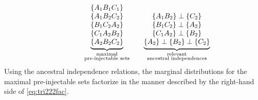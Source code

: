 {\begin{align}
\qquad\qquad
{\underbrace{\begin{matrix}
\left\lbrace A_1 B_1 C_1\right\rbrace \\
\left\lbrace A_1 B_2 C_2\right\rbrace \\
\left\lbrace B_1 C_2 A_2\right\rbrace \\
\left\lbrace C_1 A_2 B_2\right\rbrace \\
\left\lbrace A_2 B_2 C_2\right\rbrace
\end{matrix}}_{\substack{\text{maximal}\\\text{pre-injectable sets}}}}
\qquad
{\underbrace{\begin{matrix}
\\
\{A_1 B_2\} \perp\{ C_2\} \\
\{B_1 C_2\} \perp\{ A_2\} \\
\{C_1 A_2\} \perp\{ B_2\} \\
\{A_2\} \perp\{B_2\} \perp\{ C_2\}
\end{matrix}}_{\substack{\text{relevant}\\\text{ancestral independences}}}}
\end{align}
Using the ancestral independence relations, the marginal distributions for the maximal pre-injectable sets factorize in the manner described by the right-hand side of \cref{eq:tri222fac}.

}
